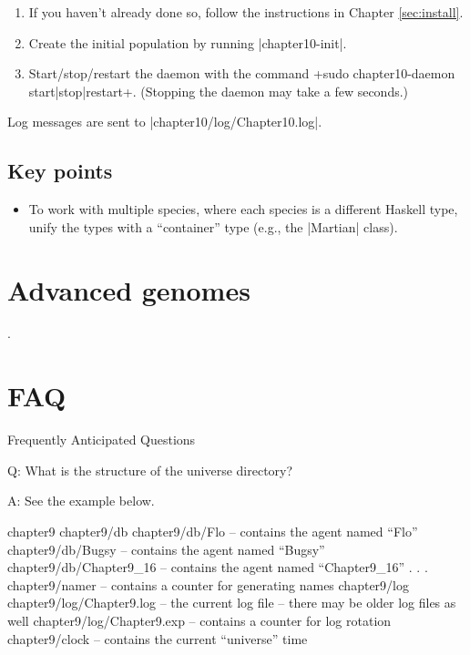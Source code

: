 \documentclass[a4paper,10pt]{report}
\begin{document}
\begin{enumerate}
\item If you haven't already done so, follow the instructions in Chapter 
\ref{sec:install}.
\item Create the initial population by running |chapter10-init|.
\item Start/stop/restart the daemon with the command
\UndefineShortVerb{\|}
\DefineShortVerb{\+}
+sudo chapter10-daemon start|stop|restart+.
\UndefineShortVerb{\+}
\DefineShortVerb{\|}
(Stopping the daemon may take a few seconds.)
\end{enumerate}

Log messages are sent to |chapter10/log/Chapter10.log|.

\section{Key points}

\begin{itemize}
\item To work with multiple species, where each species is a different Haskell type,
unify the types with a ``container'' type (e.g., the |Martian| class).
\end{itemize}

\chapter{Advanced genomes}
\label{sec:advanced}.



\chapter{FAQ}

Frequently Anticipated Questions

Q: What is the structure of the universe directory?

A: See the example below.

\begin{code}
chapter9
chapter9/db
chapter9/db/Flo            -- contains the agent named ``Flo''
chapter9/db/Bugsy          -- contains the agent named ``Bugsy''
chapter9/db/Chapter9_16    -- contains the agent named ``Chapter9_16''
. . .
chapter9/namer             -- contains a counter for generating names
chapter9/log
chapter9/log/Chapter9.log  -- the current log file
                           -- there may be older log files as well
chapter9/log/Chapter9.exp  -- contains a counter for log rotation
chapter9/clock             -- contains the current ``universe'' time
\end{code}
\end{document}
